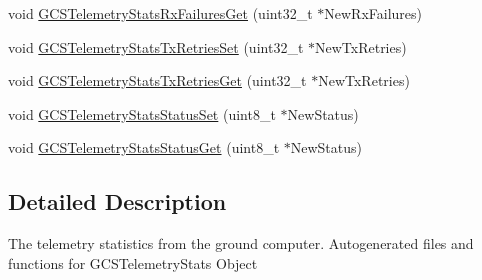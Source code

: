 \begin{DoxyCompactItemize}
void \hyperlink{group___g_c_s_telemetry_stats_gada65cce8522d39ba8d2fcc4947c144e6}{\-G\-C\-S\-Telemetry\-Stats\-Rx\-Failures\-Get} (uint32\-\_\-t $\ast$\-New\-Rx\-Failures)
\item 
void \hyperlink{group___g_c_s_telemetry_stats_ga7de2364d62fc92d12f7794d2dd292c21}{\-G\-C\-S\-Telemetry\-Stats\-Tx\-Retries\-Set} (uint32\-\_\-t $\ast$\-New\-Tx\-Retries)
\item 
void \hyperlink{group___g_c_s_telemetry_stats_ga3c647c83d6bf2314d0029b37339cfac4}{\-G\-C\-S\-Telemetry\-Stats\-Tx\-Retries\-Get} (uint32\-\_\-t $\ast$\-New\-Tx\-Retries)
\item 
void \hyperlink{group___g_c_s_telemetry_stats_ga382190346b45b6fccf4ccac4117478d4}{\-G\-C\-S\-Telemetry\-Stats\-Status\-Set} (uint8\-\_\-t $\ast$\-New\-Status)
\item 
void \hyperlink{group___g_c_s_telemetry_stats_ga78f5d4bfd3a4b2613b6c6462d33da0cd}{\-G\-C\-S\-Telemetry\-Stats\-Status\-Get} (uint8\-\_\-t $\ast$\-New\-Status)
\end{DoxyCompactItemize}


\subsection{\-Detailed \-Description}
\-The telemetry statistics from the ground computer. \-Autogenerated files and functions for \-G\-C\-S\-Telemetry\-Stats \-Object 

